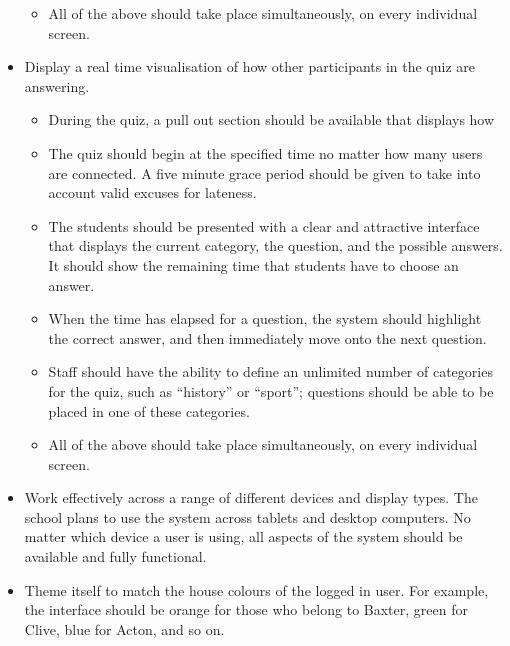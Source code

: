 \begin{itemize}
\begin{itemize}
			\item All of the above should take place simultaneously, on every individual screen.
		\end{itemize}

	\item Display a real time visualisation of how other participants in the quiz are answering.

		\begin{itemize}
			\item During the quiz, a pull out section should be available that displays how 

			\item The quiz should begin at the specified time no matter how many users are connected. A five minute grace period should be given to take into account valid excuses for lateness.

			\item The students should be presented with a clear and attractive interface that displays the current category, the question, and the possible answers. It should show the remaining time that students have to choose an answer.

			\item When the time has elapsed for a question, the system should highlight the correct answer, and then immediately move onto the next question.

			\item Staff should have the ability to define an unlimited number of categories for the quiz, such as ``history'' or ``sport''; questions should be able to be placed in one of these categories.

			\item All of the above should take place simultaneously, on every individual screen.
		\end{itemize}

	\item Work effectively across a range of different devices and display types. The school plans to use the system across tablets and desktop computers. No matter which device a user is using, all aspects of the system should be available and fully functional.

	\item Theme itself to match the house colours of the logged in user. For example, the interface should be orange for those who belong to Baxter, green for Clive, blue for Acton, and so on.
\end{itemize}
